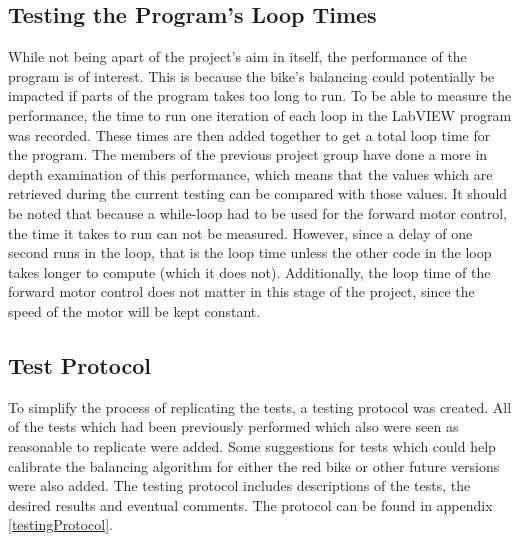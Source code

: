 \subsection{Testing the Program's Loop Times} \label{method:loopTimes}

While not being apart of the project's aim in itself, the performance of the program is of interest. This is because the bike's balancing could potentially be impacted if parts of the program takes too long to run. To be able to measure the performance, the time to run one iteration of each loop in the LabVIEW program was recorded. These times are then added together to get a total loop time for the program. The members of the previous project group have done a more in depth examination of this performance, which means that the values which are retrieved during the current testing can be compared with those values. It should be noted that because a while-loop had to be used for the forward motor control, the time it takes to run can not be measured. However, since a delay of one second runs in the loop, that is the loop time unless the other code in the loop takes longer to compute (which it does not). Additionally, the loop time of the forward motor control does not matter in this stage of the project, since the speed of the motor will be kept constant.

\subsection{Test Protocol}

To simplify the process of replicating the tests, a testing protocol was created. All of the tests which had been previously performed which also were seen as reasonable to replicate were added. Some suggestions for tests which could help calibrate the balancing algorithm for either the red bike or other future versions were also added. The testing protocol includes descriptions of the tests, the desired results and eventual comments. The protocol can be found in appendix \ref{testingProtocol}.